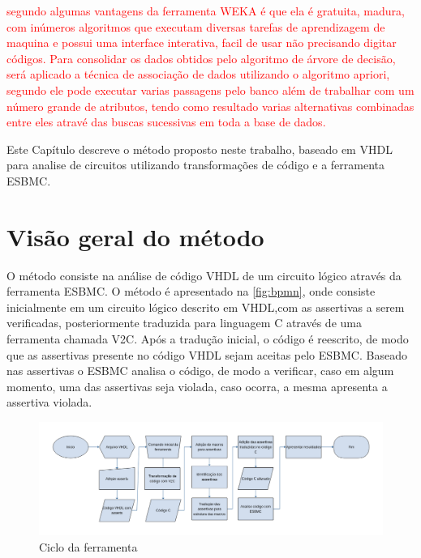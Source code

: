 \par
\textcolor{red}{segundo  algumas vantagens da ferramenta WEKA é que ela é gratuita, madura, com inúmeros algoritmos que executam diversas tarefas de aprendizagem de maquina e possui uma interface interativa, facil de usar não precisando digitar códigos. Para consolidar os dados obtidos pelo algoritmo de árvore de decisão, será aplicado a técnica de associação de dados utilizando o algoritmo apriori, segundo  ele pode executar varias passagens pelo banco além de trabalhar com um número grande de atributos, tendo como resultado varias alternativas combinadas entre eles atravé das buscas sucessivas em toda a base de dados.}


















Este Capítulo descreve o método proposto neste trabalho, baseado em VHDL para analise de circuitos utilizando transformações de código e a ferramenta ESBMC.

\section{Visão geral do método}
O método consiste na análise de código VHDL de um circuito lógico através da ferramenta ESBMC. O método é apresentado na \autoref{fig:bpmn}, onde consiste inicialmente em um circuito lógico descrito em VHDL,com as assertivas a serem verificadas, posteriormente traduzida para linguagem C através de uma ferramenta chamada V2C. Após a tradução inicial, o código é reescrito, de modo que as assertivas presente no código VHDL sejam aceitas pelo ESBMC. Baseado nas assertivas o ESBMC analisa o código, de modo a verificar, caso em algum momento, uma das assertivas seja violada, caso ocorra, a mesma apresenta a assertiva violada.

\begin{figure}[htb]
	\begin{center}
    \caption{\label{fig:bpmn}Ciclo da ferramenta}
	\includegraphics[scale=0.4]{Figuras/bpmn.png}
	\end{center}
\end{figure}

